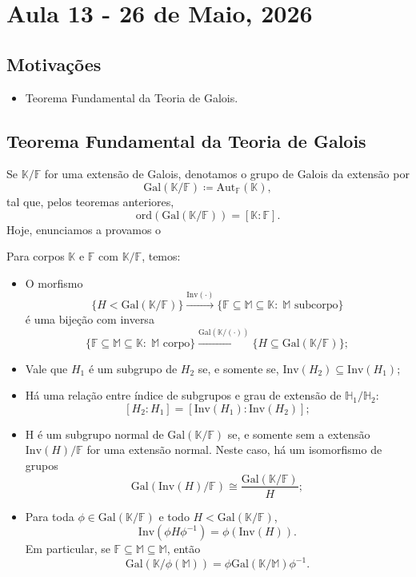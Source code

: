 \documentclass[../algebraIII_notes.tex]{subfiles}
\begin{document}
\section{Aula 13 - 26 de Maio, 2026}
\subsection{Motivações}
\begin{itemize}
	\item Teorema Fundamental da Teoria de Galois.
\end{itemize}
\subsection{Teorema Fundamental da Teoria de Galois}
Se \(\mathbb{K}/\mathbb{F}\) for uma extensão de Galois, denotamos o grupo de Galois da extensão por
\[
	\mathrm{Gal}(\mathbb{K}/\mathbb{F}) \coloneqq \mathrm{Aut}_{\mathbb{F}}(\mathbb{K}),
\]
tal que, pelos teoremas anteriores,
\[
	\mathrm{ord}(\mathrm{Gal}(\mathbb{K}/\mathbb{F})) = [\mathbb{K}:\mathbb{F}].
\]
Hoje, enunciamos a provamos o
\hypertarget{fundamental_galois}{
	\begin{theorem*}
		Para corpos \(\mathbb{K}\) e \(\mathbb{F}\) com \(\mathbb{K}/\mathbb{F}\), temos:
		\begin{itemize}
			\item[1)] O morfismo
			      \[
				      \{H < \mathrm{Gal}(\mathbb{K}/\mathbb{F})\}\stackrel{\mathrm{Inv}(\cdot )}\longrightarrow  \{\mathbb{F}\subseteq \mathbb{M}\subseteq \mathbb{K}:\; \mathbb{M} \text{ subcorpo}\}
			      \]
			      é uma bijeção com inversa
			      \[
				      \{\mathbb{F}\subseteq \mathbb{M}\subseteq \mathbb{K}:\; \mathbb{M} \text{ corpo}\}\stackrel{\mathrm{Gal}(\mathbb{K}/(\cdot ))}\longrightarrow  \{H\subseteq \mathrm{Gal}(\mathbb{K}/\mathbb{F})\};
			      \]
			\item[2)] Vale que \(H_1\) é um subgrupo de \(H_2\) se, e somente se, \(\mathrm{Inv}(H_2)\subseteq \mathrm{Inv}(H_1)\);
			\item[3)] Há uma relação entre índice de subgrupos e grau de extensão de \(\mathbb{H}_1/\mathbb{H}_2\):
			      \[
				      [H_2: H_1]= [\mathrm{Inv}(H_1):\mathrm{Inv}(H_2)];
			      \]
			\item[4)] H é um subgrupo normal de \(\mathrm{Gal}(\mathbb{K}/\mathbb{F})\) se, e somente sem a extensão \(\mathrm{Inv}(H)/\mathbb{F}\) for uma extensão normal. Neste caso, há um isomorfismo de grupos
			      \[
				      \mathrm{Gal}(\mathrm{Inv}(H)/\mathbb{F})\cong \frac{\mathrm{Gal}(\mathbb{K}/\mathbb{F})}{H};
			      \]
			\item[5)] Para toda \(\phi \in \mathrm{Gal}(\mathbb{K}/\mathbb{F})\) e todo \(H < \mathrm{Gal}(\mathbb{K}/\mathbb{F})\),
			      \[
				      \mathrm{Inv}(\phi H \phi^{-1}) = \phi (\mathrm{Inv}(H)).
			      \]
			      Em particular, se \(\mathbb{F}\subseteq \mathbb{M}\subseteq \mathbb{M}\), então
			      \[
				      \mathrm{Gal}(\mathbb{K}/\phi (\mathbb{M})) = \phi  \mathrm{Gal}(\mathbb{K}/\mathbb{M})\phi^{-1}.
			      \]
		\end{itemize}
	\end{theorem*}}
\end{document}
